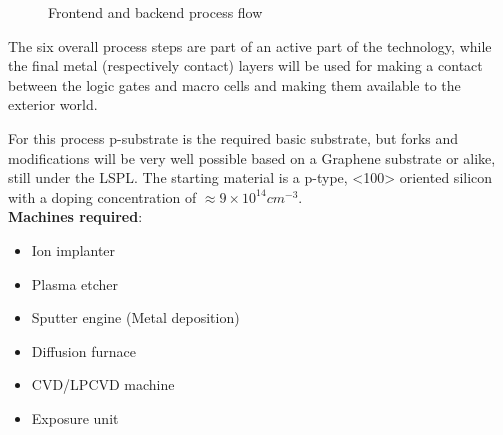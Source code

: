 \begin{figure}[H]
	\caption{Frontend and backend process flow}
	\label{full_flow}
\end{figure}
The six overall process steps are part of an active part of the technology, while the final metal (respectively contact) layers will be used for making a contact between the logic gates and macro cells and making them available to the exterior world.

For this process p-substrate is the required basic substrate, but forks and modifications will be very well possible based on a Graphene substrate or alike, still under the LSPL.
The starting material is a p-type, <100> oriented silicon with a doping concentration of $\approx 9\times10^{14}cm^{-3}$.\\

\textbf{Machines required}:
\begin{itemize}
	\item Ion implanter
	\item Plasma etcher
	\item Sputter engine (Metal deposition) 
	\item Diffusion furnace
	\item CVD/LPCVD machine 
	\item Exposure unit
\end{itemize}
